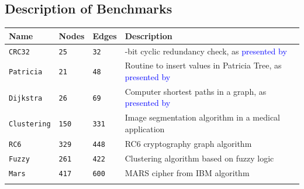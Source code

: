 \documentclass{doublecol-new}
\theoremstyle{TH}{
\newtheorem{lemma}{Lemma}
\newtheorem{theorem}[lemma]{Theorem}
\newtheorem{corrolary}[lemma]{Corrolary}
\newtheorem{conjecture}[lemma]{Conjecture}
\newtheorem{proposition}[lemma]{Proposition}
\newtheorem{claim}[lemma]{Claim}
\newtheorem{stheorem}[lemma]{Wrong Theorem}
\newtheorem{algorithm}{Algorithm}
}
\theoremstyle{THrm}{
\newtheorem{definition}{Definition}[section]
\newtheorem{question}{Question}[section]
\newtheorem{remark}{Remark}
\newtheorem{scheme}{Scheme}
}
\theoremstyle{THhit}{
\newtheorem{case}{Case}[section]
}
\begin{document}
\subsection{Description of Benchmarks}
\label{Benchmarks-Description}

\begin{minipage}{\linewidth}
\centering
\small
\sffamily\small
\tabulinesep=4pt
\begin{tabular}[c]{m{1.5cm}m{0.7cm}m{0.7cm}m{4.0 cm}}
\toprule[1.5pt]
\textbf{Name} & \textbf{Nodes} & \textbf{Edges} & \textbf{Description}\\
\midrule
\verb|CRC32| & \verb|25| & \verb|32| & \rmfamily 32-bit cyclic redundancy check, as \textcolor{blue}{presented by}~\cite{Guthaus2001}\\
\hline
\verb|Patricia| & \verb|21| & \verb|48| & \rmfamily
\vspace{0.8 mm} Routine to insert values in Patricia Tree, as \textcolor{blue}{presented by} ~\cite{Guthaus2001}\\
\hline
\verb|Dijkstra| & \verb|26| & \verb|69| & \rmfamily \vspace{0.8 mm} Computer shortest paths in a graph, as \textcolor{blue}{presented by}~\cite{Guthaus2001}\\
\hline
\verb|Clustering| & \verb|150| & \verb|331| & \rmfamily \vspace{0.8 mm} Image segmentation algorithm in a medical application\\
\hline
\verb|RC6| & \verb|329| & \verb|448| & \rmfamily \vspace{0.8 mm} RC6 cryptography graph algorithm\\
\hline
\verb|Fuzzy| & \verb|261| & \verb|422| & \rmfamily \vspace{0.8 mm} Clustering algorithm based on fuzzy logic\\
\hline
\verb|Mars| & \verb|417| & \verb|600| & \rmfamily 
\vspace{1 mm} MARS cipher from IBM algorithm\\
\bottomrule[1.5pt]
\label{tab:Description-of-Benchmarks} 
\end{tabular}\par
\bigskip
\end{minipage}
\end{document}
